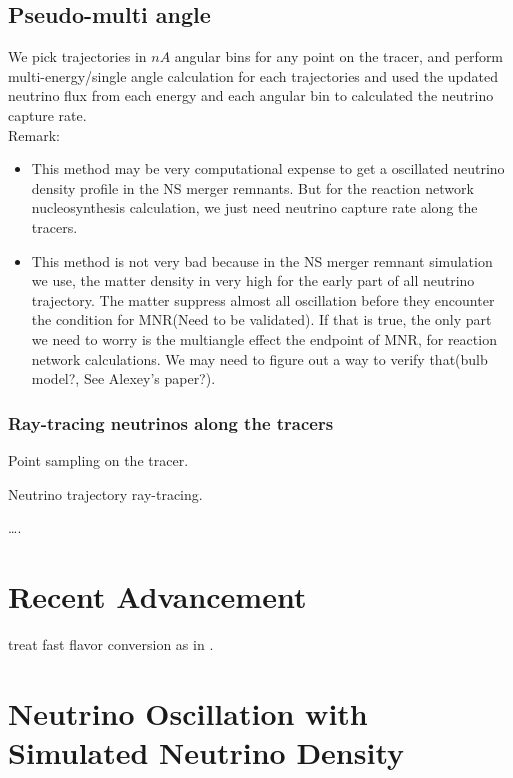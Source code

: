 \documentclass[
reprint,
preprintnumbers,
 amsmath,
 amssymb,
 aps,
onecolumn,
prd,
]{revtex4-2}
\begin{document}
\subsection{Pseudo-multi angle}
We pick trajectories in $nA$ angular bins for any point on the tracer, and perform multi-energy/single angle calculation for each trajectories and used the updated neutrino flux from each energy and each angular bin to calculated the neutrino capture rate.
\\
Remark: 
\begin{itemize}
\item This method may be very computational expense to get a oscillated neutrino density profile in the NS merger remnants. But for the reaction network nucleosynthesis calculation, we just need neutrino capture rate along the tracers.
\item This method is not very bad because in the NS merger remnant simulation we use, the matter density in very high for the early part of all neutrino trajectory. The matter suppress almost all oscillation before they encounter the condition for MNR(Need to be validated). If that is true, the only part we need to worry is the multiangle effect the endpoint of MNR, for reaction network calculations. We may need to figure out a way to verify that(bulb model?, See Alexey's paper?).
\end{itemize}

\subsubsection{Ray-tracing neutrinos along the tracers}
Point sampling on the tracer.

Neutrino trajectory ray-tracing.







\begin{acknowledgments}
\dots.

\end{acknowledgments}

\appendix

\section{Recent Advancement}
\citet{Li2021Neutri} treat fast flavor conversion as in \citet{Sarikas2012Suppre}.

\section{Neutrino Oscillation with Simulated Neutrino Density}
\end{document}
